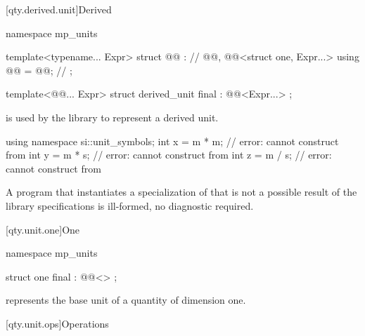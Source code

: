 [qty.derived.unit]{Derived}

\begin{codeblock}
namespace mp_units {

template<typename... Expr>
struct @@ :              // \expos
    @@,
    @@<struct one, Expr...> {
  using @@ = @@;  // \expos
};

template<@@... Expr>
struct derived_unit final : @@<Expr...> {};

}
\end{codeblock}

\pnum
{} is used by the library
to represent a derived unit.
\begin{example}
\begin{codeblock}
using namespace si::unit_symbols;
int x = m * m;  // error: cannot construct from 
int y = m * s;  // error: cannot construct from 
int z = m / s;  // error: cannot construct from 
\end{codeblock}
\end{example}
A program that instantiates a specialization of 
that is not a possible result of the library specifications
is ill-formed, no diagnostic required.

[qty.unit.one]{One}

\begin{codeblock}
namespace mp_units {

struct one final : @@<> {};

}
\end{codeblock}

\pnum
{} represents the base unit of a quantity of dimension one.

[qty.unit.ops]{Operations}

